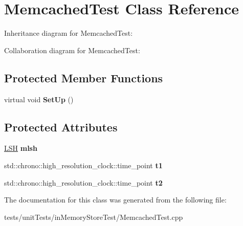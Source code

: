 \hypertarget{classMemcachedTest}{}\section{Memcached\+Test Class Reference}
\label{classMemcachedTest}


Inheritance diagram for Memcached\+Test\+:


Collaboration diagram for Memcached\+Test\+:
\subsection*{Protected Member Functions}
\begin{DoxyCompactItemize}
\item 
virtual void {\bfseries Set\+Up} ()\hypertarget{classMemcachedTest_a07a1c0d6fc4d54e05704873fed02ab82}{}\label{classMemcachedTest_a07a1c0d6fc4d54e05704873fed02ab82}

\end{DoxyCompactItemize}
\subsection*{Protected Attributes}
\begin{DoxyCompactItemize}
\item 
\hyperlink{classLSH}{L\+SH} {\bfseries mlsh}\hypertarget{classMemcachedTest_ac2c76b3b3ae232316159f12bc1dae178}{}\label{classMemcachedTest_ac2c76b3b3ae232316159f12bc1dae178}

\item 
std\+::chrono\+::high\+\_\+resolution\+\_\+clock\+::time\+\_\+point {\bfseries t1}\hypertarget{classMemcachedTest_a1ee5561ad4e2f6191520982c6f236ea6}{}\label{classMemcachedTest_a1ee5561ad4e2f6191520982c6f236ea6}

\item 
std\+::chrono\+::high\+\_\+resolution\+\_\+clock\+::time\+\_\+point {\bfseries t2}\hypertarget{classMemcachedTest_adb56da15631d637b39ef1b28f983aff9}{}\label{classMemcachedTest_adb56da15631d637b39ef1b28f983aff9}

\end{DoxyCompactItemize}


The documentation for this class was generated from the following file\+:\begin{DoxyCompactItemize}
\item 
tests/unit\+Tests/in\+Memory\+Store\+Test/Memcached\+Test.\+cpp\end{DoxyCompactItemize}
